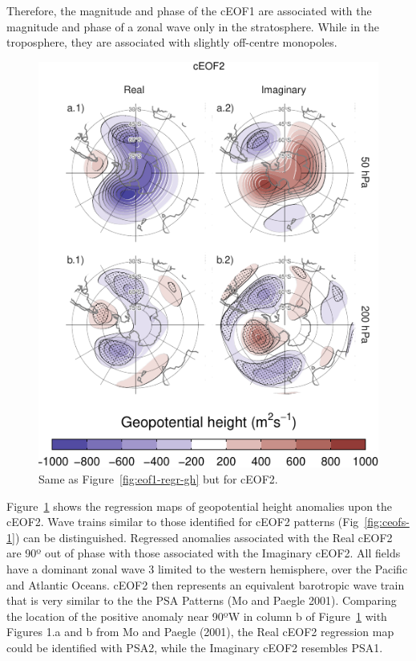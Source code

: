 \documentclass[smallextended]{svjour3}       %
\begin{document}
Therefore, the magnitude and phase of the cEOF1 are associated with the magnitude and phase of a zonal wave only in the stratosphere.
While in the troposphere, they are associated with slightly off-centre monopoles.



\begin{figure}
\centering
\includegraphics{../figures/eof2-regr-gh-1.pdf}
\caption{\label{fig:eof2-regr-gh}Same as Figure~\ref{fig:eof1-regr-gh} but for cEOF2.}
\end{figure}

Figure~\ref{fig:eof2-regr-gh} shows the regression maps of geopotential height anomalies upon the cEOF2.
Wave trains similar to those identified for cEOF2 patterns (Fig~\ref{fig:ceofs-1}) can be distinguished.
Regressed anomalies associated with the Real cEOF2 are 90º out of phase with those associated with the Imaginary cEOF2.
All fields have a dominant zonal wave 3 limited to the western hemisphere, over the Pacific and Atlantic Oceans.
cEOF2 then represents an equivalent barotropic wave train that is very similar to the the PSA Patterns (Mo and Paegle 2001).
Comparing the location of the positive anomaly near 90ºW in column b of Figure~\ref{fig:eof2-regr-gh} with Figures 1.a and b from Mo and Paegle (2001), the Real cEOF2 regression map could be identified with PSA2, while the Imaginary cEOF2 resembles PSA1.
\end{document}
